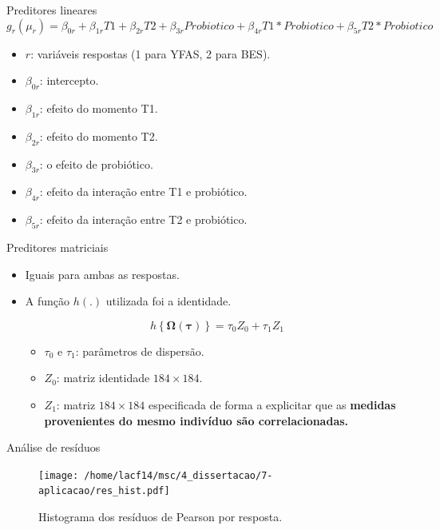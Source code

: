 \documentclass[
  ignorenonframetext,
  serif,
  professionalfont,
  usenames,
  dvipsnames,
  aspectratio = 169]{beamer}
\begin{document}
\begin{frame}{Preditores lineares}
\protect\hypertarget{preditores-lineares}{}
\[
g_{r}(\mu_{r}) = \beta_{0r} + \beta_{1r} T1 + \beta_{2r} T2 + \beta_{3r} Probiotico + \beta_{4r} T1*Probiotico + \beta_{5r} T2*Probiotico
\]

\begin{itemize}
  \item $r$: variáveis respostas (1 para YFAS, 2 para BES). 
  \item $\beta_{0r}$: intercepto.
  \item $\beta_{1r}$: efeito do momento T1.
  \item $\beta_{2r}$: efeito do momento T2.
  \item $\beta_{3r}$: o efeito de probiótico. 
  \item $\beta_{4r}$: efeito da interação entre T1 e probiótico.
  \item $\beta_{5r}$: efeito da interação entre T2 e probiótico.
\end{itemize}
\end{frame}

\begin{frame}{Preditores matriciais}
\protect\hypertarget{preditores-matriciais}{}
\begin{itemize}
  \itemsep 2ex
  
  \item Iguais para ambas as respostas.

  \item A função $h(.)$ utilizada foi a identidade.

$$h\left \{ \boldsymbol{\Omega}(\boldsymbol{\tau}) \right \} = \tau_0Z_0 + \tau_1Z_1$$
  \begin{itemize}
    \item $\tau_0$ e $\tau_1$: parâmetros de dispersão. 
    \item $Z_0$: matriz identidade $184 \times 184$.
    \item $Z_1$: matriz $184 \times 184$ especificada de forma a explicitar que as \textbf{medidas provenientes do mesmo indivíduo são correlacionadas.} 
  \end{itemize}
\end{itemize}
\end{frame}

\begin{frame}{Análise de resíduos}
\protect\hypertarget{anuxe1lise-de-resuxedduos}{}
\begin{figure}[H]
\centering
\texttt{[image: /home/lacf14/msc/4\_dissertacao/7-aplicacao/res\_hist.pdf]}
\caption{Histograma dos resíduos de Pearson por resposta.}
\label{fig:diagnostico1}
\end{figure}
\end{frame}
\end{document}
